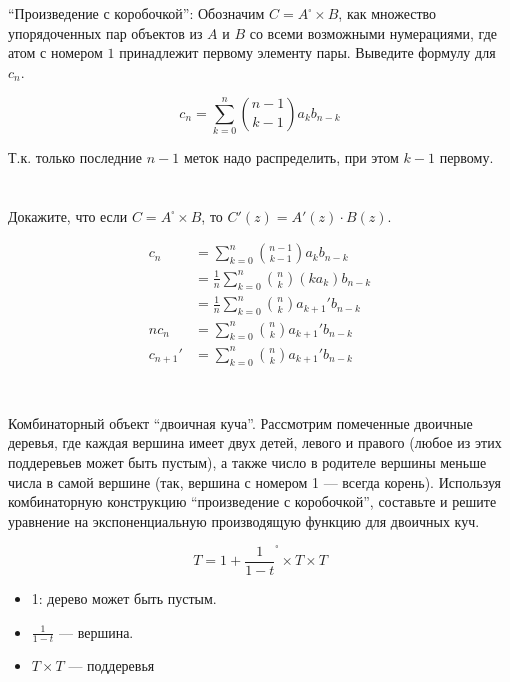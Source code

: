 \section{}
``Произведение с коробочкой'': Обозначим \(C = A^{\square} \times B\), как множество упорядоченных пар объектов из \(A\) и \(B\) со всеми возможными нумерациями, где атом с номером \(1\) принадлежит первому элементу пары. Выведите формулу для \(c_n\).

\[c_n = \sum_{k = 0}^n \binom{n - 1}{k - 1} a_k b_{n - k}\]

Т.к. только последние \(n - 1\) меток надо распределить, при этом \(k - 1\) первому.

\section{}
Докажите, что если \(C = A^{\square} \times B\), то \(C'(z) = A'(z) \cdot B(z)\).

\begin{align*}
    c_n      & = \sum_{k = 0}^n \binom{n - 1}{k - 1} a_k b_{n - k}          \\
             & = \frac{1}{n} \sum_{k = 0}^n \binom{n}{k} (ka_k) b_{n - k}   \\
             & = \frac{1}{n} \sum_{k = 0}^n \binom{n}{k} a_{k+1}' b_{n - k} \\
    nc_n     & = \sum_{k = 0}^n \binom{n}{k} a_{k+1}' b_{n - k}             \\
    c_{n+1}' & = \sum_{k = 0}^n \binom{n}{k} a_{k+1}' b_{n - k}             \\
\end{align*}

\section{}
Комбинаторный объект ``двоичная куча''. Рассмотрим помеченные двоичные деревья, где каждая вершина имеет двух детей, левого и правого (любое из этих поддеревьев может быть пустым), а также число в родителе вершины меньше числа в самой вершине (так, вершина с номером 1 --- всегда корень). Используя комбинаторную конструкцию ``произведение с коробочкой'', составьте и решите уравнение на экспоненциальную производящую функцию для двоичных куч.

\[T = 1 + \frac{1}{1 - t}^\square \times T \times T\]

\begin{itemize}
    \item 1: дерево может быть пустым.
    \item \(\frac{1}{1 - t}\) --- вершина.
    \item \(T \times T\) --- поддеревья
\end{itemize}

